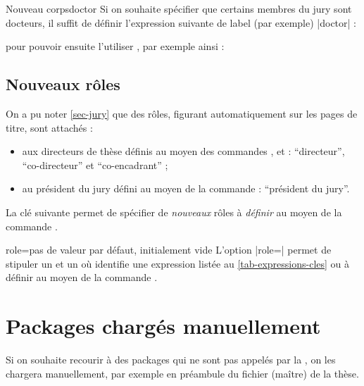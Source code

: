 \begin{dbexample}{Nouveau corps}{doctor}
  Si on souhaite spécifier que certains membres du jury sont docteurs, il
  suffit de définir  l'expression suivante de label (par
  exemple) |doctor| :
\begin{preamblecode}[title=Par exemple dans le \File{\configurationfile}]
\end{preamblecode}
  pour pouvoir ensuite l'utiliser , par
  exemple ainsi :
\begin{bodycode}
\end{bodycode}
\end{dbexample}

\subsection{Nouveaux rôles}\label{sec-nouveaux-roles}

On a pu noter \vref{sec-jury} que des rôles, figurant automatiquement sur les
pages de titre, sont attachés :
\begin{itemize}
\item aux directeurs de thèse définis au moyen des commandes
  ,  et  :
  \enquote{directeur}, \enquote{co-directeur} et \enquote{co-encadrant} ;
\item au président du jury défini au moyen de la commande
   : \enquote{président du jury}.
\end{itemize}
La clé  suivante permet de spécifier de \emph{nouveaux} rôles
à \emph{définir} au moyen de la commande .


\begin{docKey}{role}{=}{pas de valeur par défaut, initialement
    vide}
  L'option |role=| permet de stipuler un  et
  un  où  identifie une expression listée au
  \vref{tab-expressions-cles} ou à définir au moyen de la commande
  .
\end{docKey}


\section{Packages chargés manuellement}
\label{sec-options-de-classes}
Si on souhaite recourir à des packages qui ne sont pas appelés par la \yatcl{},
on les chargera manuellement, par exemple en préambule du fichier (maître) de
la thèse.

